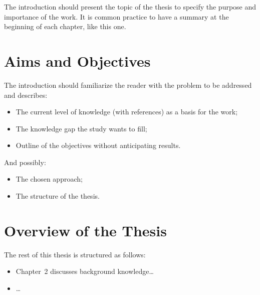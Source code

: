 The introduction should present the topic of the thesis to specify the purpose and importance of the work. It is common practice to have a summary at the beginning of each chapter, like this one.

\section{Aims and Objectives}

The introduction should familiarize the reader with the problem to be addressed and describes:
\begin{itemize}
    \item The current level of knowledge (with references) as a basis for the work;
    \item The knowledge gap the study wants to fill;
    \item Outline of the objectives without anticipating results.
\end{itemize}
And possibly:
\begin{itemize}
	\item The chosen approach;
	\item The structure of the thesis.
\end{itemize}

\section{Overview of the Thesis}

The rest of this thesis is structured as follows: 
\begin{itemize}
    \item Chapter~2 discusses background knowledge\ldots
    \item \ldots
\end{itemize}
